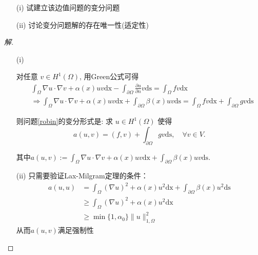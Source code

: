 \documentclass[12pt,a4paper]{article}
\begin{document}
\begin{enumerate}
		\begin{enumerate}
			\item[(i)]   试建立该边值问题的变分问题
			\item[(ii)]  讨论变分问题解的存在唯一性(适定性)
		\end{enumerate}
		\begin{proof}[解]\let\qed\relax
			\begin{enumerate}
				\item[(i)] 
				
				对任意 $v \in H^1(\Omega)$, 用Green公式可得
				$$
				\begin{aligned}
					& \int_{\Omega} \nabla u \cdot \nabla v + \alpha(x)uv \mathrm{dx}-\int_{\partial \Omega} \frac{\partial u}{\partial n} v \mathrm{ds}=\int_{\Omega} f v \mathrm{dx} \\
					& \Rightarrow  \int_{\Omega} \nabla u \cdot \nabla v + \alpha(x)uv \mathrm{dx}+\int_{\partial \Omega}\beta(x)uv \mathrm{ds}=\int_{\Omega} f v \mathrm{dx} + \int_{\partial \Omega} gv \mathrm{ds}
				\end{aligned}
				$$
				
				则问题\eqref{robin}的变分形式是: 求 $u \in H^1(\Omega)$ 使得
				\begin{equation}
					a(u, v)=(f, v)+\int_{\partial \Omega} gv \mathrm{ds}, \quad \forall v \in V.
					\label{weak2}
				\end{equation}
				
				其中$a(u, v):= \int_{\Omega} \nabla u \cdot \nabla v + \alpha(x)uv \mathrm{dx}+\int_{\partial \Omega}\beta(x)uv \mathrm{ds}$.
				
				\item[(ii)] 只需要验证Lax-Milgram定理的条件：
				\begin{equation*}
					\begin{aligned}
						a(u,u) &= \int_{\Omega} (\nabla u)^2 + \alpha(x)u^2 \mathrm{dx}+\int_{\partial \Omega}\beta(x)u^2 \mathrm{ds}\\
						&\geqslant \int_{\Omega} (\nabla u)^2 + \alpha(x)u^2 \mathrm{dx}\\
						&\geqslant \min\{1,\alpha_0\} \|u\|_{1,\Omega}^2
					\end{aligned}
				\end{equation*}
				从而$a(u,v)$满足强制性
				

\end{enumerate}
\end{proof}
\end{enumerate}
\end{document}

